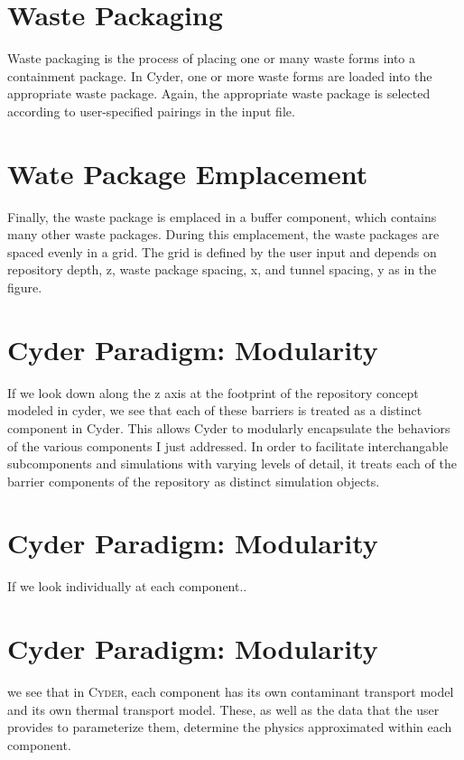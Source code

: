 \documentclass[letterpaper]{article}
\newcommand{\Cyder}{\textsc{Cyder}\xspace}
\begin{document}
\section{Waste Packaging}

Waste packaging is the process of placing one or many waste forms into a 
containment package.  In Cyder, one or more waste forms are loaded into the 
appropriate waste package. Again, the appropriate waste package is selected 
according to user-specified pairings in the input file. 


\section{Wate Package Emplacement}

Finally, the waste package is emplaced in a buffer component, which contains 
many other waste packages. During this emplacement, the waste packages are 
spaced evenly in a grid. The grid is defined by the user input and depends on 
repository depth, z, waste package spacing, x, and tunnel spacing, y as in 
the figure.

\section{Cyder Paradigm: Modularity}

If we look down along the z axis at the footprint of the repository concept 
modeled in cyder, we see that each of these barriers is treated as a distinct 
component in Cyder. This allows Cyder to modularly encapsulate the behaviors of 
the various components I just addressed. In order to facilitate interchangable 
subcomponents and simulations with varying levels of detail, it treats each of 
the barrier components of the repository as distinct simulation objects. 


\section{Cyder Paradigm: Modularity}

If we look individually at each component..

\section{Cyder Paradigm: Modularity}

we see that in \Cyder , each component has its own contaminant transport model 
and its own thermal transport model. These, as well as the data that the user 
provides to parameterize them, determine the physics approximated within each 
component. 
\end{document}
